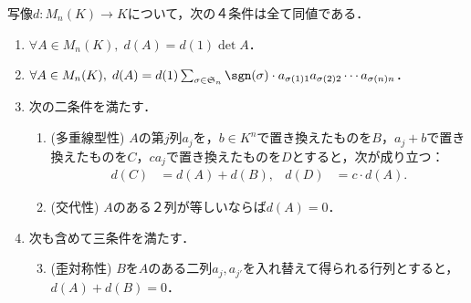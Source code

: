 \documentclass[uplatex, dvipdfmx]{jsreport}
\begin{document}
\begin{proposition}\label{prop-characterization-of-determinant}
    写像$d:M_n(K)\to K$について，次の４条件は全て同値である．
    \begin{enumerate}
        \item $\forall A\in M_n(K),\;d(A)=d(1)\det A$．
        \item $\forall A\in M_n(K),\;d(A)=d(1)\sum_{\sigma\in\mathfrak{S}_n}\sgn(\sigma)\cdot a_{\sigma(1)1}a_{\sigma(2)2}\cdots a_{\sigma(n)n}$．
        \item 次の二条件を満たす．
        \begin{enumerate}[(1)]
            \item (多重線型性)  $A$の第$j$列$a_j$を，$b\in K^n$で置き換えたものを$B$，$a_j+b$で置き換えたものを$C$，$ca_j$で置き換えたものを$D$とすると，次が成り立つ：
            \begin{align*}
                d(C)&=d(A)+d(B),&d(D)&=c\cdot d(A).
            \end{align*}
            \item (交代性)  $A$のある２列が等しいならば$d(A)=0$．
        \end{enumerate}
        \item 次も含めて三条件を満たす．
        \begin{enumerate}[(1)]\setcounter{enumii}{2}
            \item (歪対称性)  $B$を$A$のある二列$a_j,a_{j'}$を入れ替えて得られる行列とすると，$d(A)+d(B)=0$．
        \end{enumerate}
    \end{enumerate}
\end{proposition}
\end{document}

